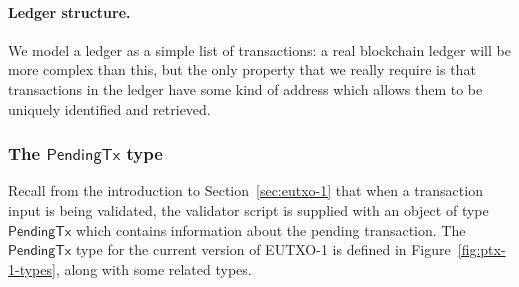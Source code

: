 \documentclass[a4paper]{article}
\newcommand{\s}{\textsf}  %
\newcommand{\ptx}{\ensuremath{\s{PendingTx}}}
\begin{document}
\paragraph{Ledger structure.} We model a ledger as a simple
list of transactions: a real blockchain ledger will be more complex
than this, but the only property that we really require is that
transactions in the ledger have some kind of address which allows them
to be uniquely identified and retrieved.

\subsubsection{The \ptx{} type}
\label{sec:pendingtx}
Recall from the introduction to Section~\ref{sec:eutxo-1} that when a
transaction input is being validated, the validator script is supplied
with an object of type \ptx{} which contains information about the
pending transaction.  The \ptx{} type for the current version of
EUTXO-1 is defined in Figure~\ref{fig:ptx-1-types}, along with some
related types.
\end{document}
